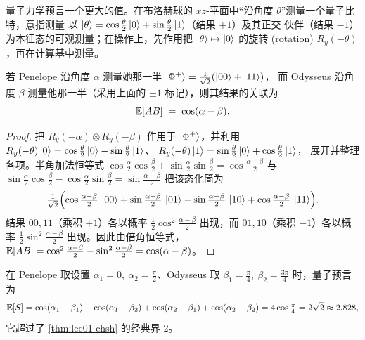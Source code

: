 量子力学预言一个更大的值。在布洛赫球的 $xz$-平面中“沿角度 $\theta$”测量一个量子比特，意指测量
以 $\ket{\theta}=\cos\tfrac{\theta}{2}\ket{0}+\sin\tfrac{\theta}{2}\ket{1}$（结果 $+1$）及其正交
伙伴（结果 $-1$）为本征态的可观测量；在操作上，先作用把 $\ket{\theta}\mapsto\ket{0}$ 的旋转
(rotation) $R_y(-\theta)$，再在计算基中测量。

\begin{proposition}[贝尔对的量子关联子]\label{prop:lec01-chsh-corr}
若 Penelope 沿角度 $\alpha$ 测量她那一半 $\ket{\Phi^{+}}=\tfrac{1}{\sqrt2}(\ket{00}+\ket{11})$，
而 Odysseus 沿角度 $\beta$ 测量他那一半（采用上面的 $\pm1$ 标记），则其结果的关联为
\begin{equation}\label{eq:lec01-chsh-cosab}
  \mathbb{E}[AB]\;=\;\cos(\alpha-\beta).
\end{equation}
\end{proposition}

\begin{proof}
把 $R_y(-\alpha)\otimes R_y(-\beta)$ 作用于 $\ket{\Phi^{+}}$，并利用
$R_y(-\theta)\ket{0}=\cos\tfrac{\theta}{2}\ket{0}-\sin\tfrac{\theta}{2}\ket{1}$、
$R_y(-\theta)\ket{1}=\sin\tfrac{\theta}{2}\ket{0}+\cos\tfrac{\theta}{2}\ket{1}$，
展开并整理各项。半角加法恒等式
$\cos\tfrac{\alpha}{2}\cos\tfrac{\beta}{2}+\sin\tfrac{\alpha}{2}\sin\tfrac{\beta}{2}
=\cos\tfrac{\alpha-\beta}{2}$ 与
$\sin\tfrac{\alpha}{2}\cos\tfrac{\beta}{2}-\cos\tfrac{\alpha}{2}\sin\tfrac{\beta}{2}
=\sin\tfrac{\alpha-\beta}{2}$ 把该态化简为
\[
  \tfrac{1}{\sqrt2}\Bigl(\cos\tfrac{\alpha-\beta}{2}\,\ket{00}
      +\sin\tfrac{\alpha-\beta}{2}\,\ket{01}
      -\sin\tfrac{\alpha-\beta}{2}\,\ket{10}
      +\cos\tfrac{\alpha-\beta}{2}\,\ket{11}\Bigr).
\]
结果 $00,11$（乘积 $+1$）各以概率 $\tfrac12\cos^{2}\tfrac{\alpha-\beta}{2}$ 出现，而
$01,10$（乘积 $-1$）各以概率 $\tfrac12\sin^{2}\tfrac{\alpha-\beta}{2}$ 出现。因此由倍角恒等式，
$\mathbb{E}[AB]=\cos^{2}\tfrac{\alpha-\beta}{2}-\sin^{2}\tfrac{\alpha-\beta}{2}=\cos(\alpha-\beta)$。
\end{proof}

\begin{corollary}\label{cor:lec01-tsirelson}
在 Penelope 取设置 $\alpha_1=0,\ \alpha_2=\tfrac{\pi}{2}$、Odysseus 取
$\beta_1=\tfrac{\pi}{4},\ \beta_2=\tfrac{3\pi}{4}$ 时，量子预言为
\[
  \mathbb{E}[S]=\cos(\alpha_1-\beta_1)-\cos(\alpha_1-\beta_2)+\cos(\alpha_2-\beta_1)+\cos(\alpha_2-\beta_2)
       =4\cos\tfrac{\pi}{4}=2\sqrt2\approx2.828,
\]
它超过了 \cref{thm:lec01-chsh} 的经典界 $2$。
\end{corollary}

